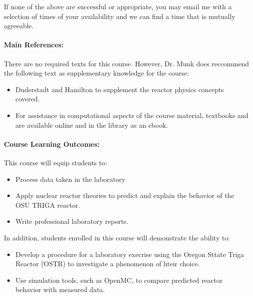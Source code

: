 \documentclass[11pt, a4paper]{article}
\begin{document}
If none of the above are successful or appropriate, you may email me with a
selection of times of your availability and we can find a time that is mutually
agreeable.

\paragraph{Main References:}
There are no required texts for this course. However, Dr. Munk does reccommend the following text as supplementary knowledge for the course:
\begin{itemize}
\item Duderstadt and Hamilton \cite{duderstadt_nuclear_1976} to supplement the reactor physics concepts covered. 
\item For assistance in computational aspects of the course material, textbooks \cite{mcclarren_computational_2017} and \cite{scopatz_effective_2015} are available online and in the library as an ebook.
\end{itemize}



\renewcommand{\refname}{\normalfont\selectfont\normalsize}\vspace{-1cm}


\paragraph{Course Learning Outcomes:}

This course will equip students to:
\begin{itemize}
\item Process data taken in the laboratory
\item Apply nuclear reactor theories to predict and explain the behavior of the OSU TRIGA reactor. 
\item Write professional laboratory reports. 
\end{itemize}

In addition, students enrolled in this course will demonstrate the ability to:

\begin{itemize}
\item Develop a procedure for a laboratory execrise using the Oregon Sttate Triga Reactor (OSTR) to investigate a phenomenon of hteir choice.
\item Use simulation tools, such as OpenMC, to compare predicted reactor behavior with measured data. 
\end{itemize}
\end{document}
